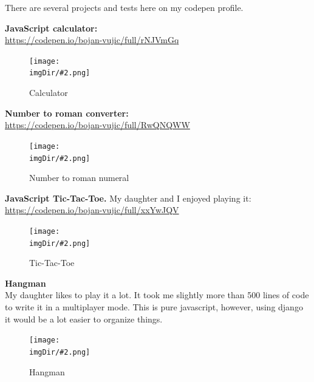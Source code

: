 \documentclass[11pt, onecolumn]{article}
\newcommand{\fig}[3]{%
	\vspace{-2mm}
	\begin{figure}[H]
		\centering
		\texttt{[image: \\imgDir/\#2.png]}
		\vspace{-3mm}
		\caption[]{#3}
		\label{fig:#2}
	\end{figure}
	\vspace{-2mm}
}
\begin{document}
\begin{multicols}{2}

There are several projects and tests here on my codepen profile.

\noindent
\textbf{JavaScript calculator:}\\
\noindent
\color{blue}\url{https://codepen.io/bojan-vujic/full/rNJVmGq}\color{black}
\fig{70mm}{img-1}{Calculator}

\noindent
\textbf{Number to roman converter:}\\
\noindent
\color{blue}\url{https://codepen.io/bojan-vujic/full/RwQNQWW}\color{black}
\fig{70mm}{img-3}{Number to roman numeral}


\noindent
\textbf{JavaScript Tic-Tac-Toe.} My daughter and I enjoyed playing it:\\
\noindent
\color{blue}\url{https://codepen.io/bojan-vujic/full/xxYwJQV}\color{black}
\fig{70mm}{img-2}{Tic-Tac-Toe}

\noindent
\textbf{Hangman}\\
My daughter likes to play it a lot. It took me slightly more than 500 lines of code to write it in a multiplayer mode. This is pure javascript, however, using django it would be a lot easier to organize things.\\
\fig{70mm}{img-4}{Hangman}

\end{multicols}
\end{document}
